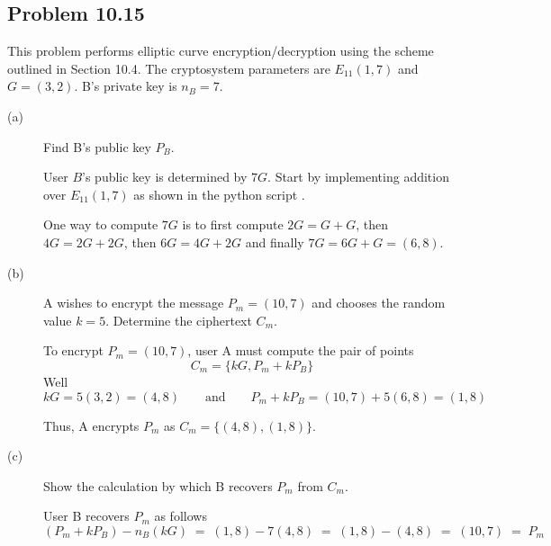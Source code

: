 \documentclass[../hw_sols.tex]{subfiles}
\begin{document}
\newpage



\subsection*{Problem 10.15}

This problem performs elliptic curve encryption/decryption using the scheme 
outlined in Section 10.4. The cryptosystem parameters are $E_{11}(1, 7)$ and 
$G = (3,2)$. B's private key is $n_B = 7$.

\begin{description}

\item[(a)] Find B's public key $P_B$.

\begin{solution}
User $B$'s public key is determined by $7G$. Start by implementing addition 
over $E_{11}(1,7)$ as shown in the python script 
.



One way to compute $7G$ is to first compute $2G = G + G$, then 
$4G = 2G + 2G$, then $6G = 4G + 2G$ and finally $7G = 6G + G = (6,8)$.
\end{solution}

\item[(b)] A wishes to encrypt the message $P_m = (10,7)$ and chooses the 
random value $k = 5$. Determine the ciphertext $C_m$.

\begin{solution}
To encrypt $P_m = (10,7)$, user A must compute the pair of points
	\[ C_m = \{kG, P_m + kP_B\} \]
Well 
	\[ kG = 5 (3,2) = (4,8)
	\qquad \text{and} \qquad
	P_m + kP_B = (10,7) + 5(6,8) = (1,8) \]

Thus, A encrypts $P_m$ as $C_m = \{(4,8),(1,8)\}$.
\end{solution}

\item[(c)] Show the calculation by which B recovers $P_m$ from $C_m$.

\begin{solution}
User B recovers $P_m$ as follows
	\[ (P_m + kP_B) - n_B(kG) \; 
	= \; (1,8) - 7(4,8) \; 
	= \; (1,8) - (4,8) \; 
	= \; (10,7) \; = \; P_m \]
\end{solution}

\end{description}
\end{document}
